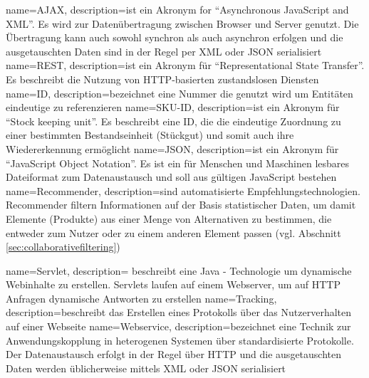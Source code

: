 
{
  name=AJAX,
  description={ist ein Akronym for ``Asynchronous JavaScript and XML''. Es wird zur Datenübertragung zwischen Browser und Server genutzt. Die Übertragung kann auch sowohl synchron als auch asynchron erfolgen und die ausgetauschten Daten sind in der Regel per XML oder JSON serialisiert}
}
{
  name=REST,
  description={ist ein Akronym für ``Representational State Transfer''. Es beschreibt die Nutzung von HTTP-basierten zustandslosen Diensten}
}
{
  name=ID,
  description={bezeichnet eine Nummer die genutzt wird um Entitäten eindeutige zu referenzieren}
}
{
  name=SKU-ID,
  description={ist ein Akronym für ``Stock keeping unit''. Es beschreibt eine ID, die die eindeutige Zuordnung zu einer bestimmten Bestandseinheit (Stückgut) und somit auch ihre Wiedererkennung ermöglicht}
}
{
  name=JSON,
  description={ist ein Akronym für ``JavaScript Object Notation''. Es ist ein für Menschen und Maschinen lesbares Dateiformat zum Datenaustausch und soll aus gültigen JavaScript bestehen}
}
{
  name=Recommender,
  description={sind automatisierte Empfehlungstechnologien. Recommender filtern Informationen auf der Basis statistischer Daten, um damit Elemente (Produkte) aus einer Menge von Alternativen zu bestimmen, die entweder zum Nutzer oder zu einem anderen Element passen (vgl. Abschnitt \ref{sec:collaborativefiltering})}
}

{
  name=Servlet,
  description={ beschreibt eine Java - Technologie um dynamische Webinhalte zu erstellen. Servlets laufen auf einem Webserver, um auf HTTP Anfragen dynamische Antworten zu erstellen}
}
{
  name=Tracking,
  description={beschreibt das Erstellen eines Protokolls über das Nutzerverhalten auf einer Webseite}
}
{
  name=Webservice,
  description={bezeichnet eine Technik zur Anwendungskopplung in heterogenen Systemen über standardisierte Protokolle. Der Datenaustausch erfolgt in der Regel über HTTP und die ausgetauschten Daten werden üblicherweise mittels XML oder JSON serialisiert}
}